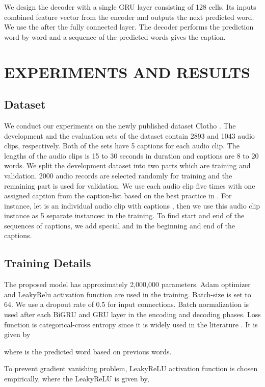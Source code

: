 \documentclass{article}
\begin{document}
We design the decoder with a single GRU layer consisting of 128 cells. Its inputs combined feature vector from the encoder and outputs the next predicted word. We use the  after the fully connected layer. The decoder performs the prediction word by word and a sequence of the predicted words gives the caption.

\section{EXPERIMENTS AND RESULTS}
\subsection{Dataset}

We conduct our experiments on the newly published dataset Clotho \cite{Drossos_2020}. The development and the evaluation sets of the dataset contain 2893 and 1043 audio clips, respectively. Both of the sets have 5 captions for each audio clip. The lengths of the audio clips is 15 to 30 seconds in duration and captions are 8 to 20 words. We split the development dataset into two parts which are training and validation. 2000 audio records are selected randomly for training and the remaining part is used for validation. We use each audio clip five times with one assigned caption from the caption-list based on the best practice in \cite{Drossos_2020}. For instance, let  is an individual audio clip with captions  , then we use this audio clip instance as 5 separate instances:  in the training. To find start and end of the sequences of captions, we add special  and  in the beginning and end of the captions.

\subsection{Training Details}

The proposed model has approximately 2,000,000 parameters. Adam optimizer and LeakyRelu activation function are used in the training. Batch-size is set to 64. We use a dropout rate of 0.5 for input connections. Batch normalization \cite{DBLP:journals/corr/IoffeS15} is used after each BiGRU and GRU layer in the encoding and decoding phases. Loss function is categorical-cross entropy since it is widely used in the literature \cite{tanti-etal-2017-role}. It is given by  

 
where  is the predicted word based on previous words.

To prevent gradient vanishing problem, LeakyReLU activation function is chosen empirically, where the LeakyReLU is given by, 
\end{document}
